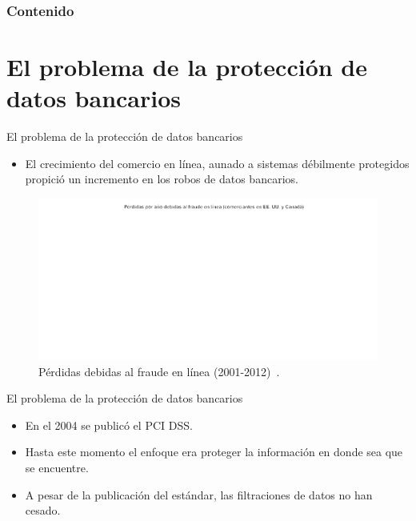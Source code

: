 \documentclass{beamer}
\begin{document}
  {
  \frame{\titlepage}}

  \begin{frame}
    \frametitle{Contenido}
    \setcounter{tocdepth}{1}
    \tableofcontents
  \end{frame}

  \setlength{\parskip}{0.5em}

  \section{El problema de la protección de datos bancarios}

  \begin{frame}{El problema de la protección de datos bancarios}
    \begin{itemize}
      \item El crecimiento del comercio en línea, aunado a sistemas débilmente
        protegidos propició un incremento en los robos de datos bancarios.
    \end{itemize}

    \begin{figure}[H]
      \centering
      \includegraphics[width=0.9\linewidth]
         {diagramas_comunes/intro/perdidas_fraude_bn.png}
      \caption{P\'{e}rdidas debidas al fraude en l\'{i}nea (2001-2012)~\cite{wallethub}.}
    \end{figure}
  \end{frame}

  \begin{frame}{El problema de la protección de datos bancarios}
    \begin{itemize}
      \item En el 2004 se publicó el PCI DSS\footnotemark \cite{pci_dss}.
      \item Hasta este momento el enfoque era proteger la información en donde
        sea que se encuentre.
      \item A pesar de la publicación del estándar, las filtraciones de datos
        no han cesado.
    \end{itemize}
  \end{frame}
\end{document}
